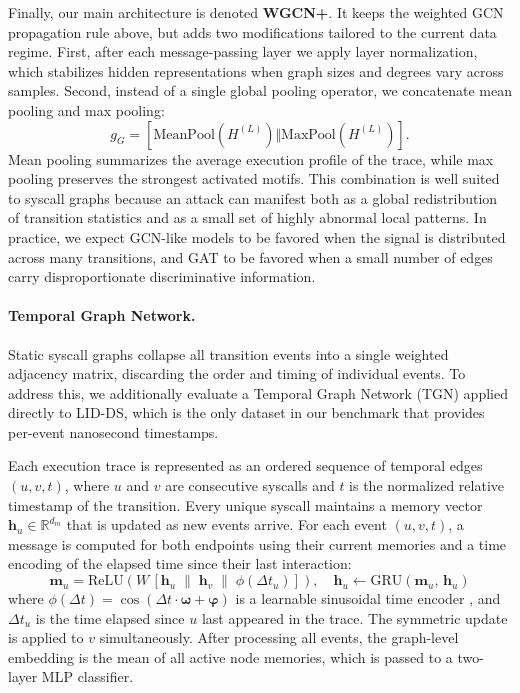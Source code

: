 \documentclass{article}
\begin{document}
Finally, our main architecture is denoted \textbf{WGCN+}. It keeps the weighted GCN propagation rule above, but adds two modifications tailored to the current data regime. First, after each message-passing layer we apply layer normalization, which stabilizes hidden representations when graph sizes and degrees vary across samples. Second, instead of a single global pooling operator, we concatenate mean pooling and max pooling:
\[
g_G = \left[\mathrm{MeanPool}\!\left(H^{(L)}\right) \Vert \mathrm{MaxPool}\!\left(H^{(L)}\right)\right].
\]
Mean pooling summarizes the average execution profile of the trace, while max pooling preserves the strongest activated motifs. This combination is well suited to syscall graphs because an attack can manifest both as a global redistribution of transition statistics and as a small set of highly abnormal local patterns. In practice, we expect GCN-like models to be favored when the signal is distributed across many transitions, and GAT to be favored when a small number of edges carry disproportionate discriminative information.

\paragraph{Temporal Graph Network.}
Static syscall graphs collapse all transition events into a single weighted adjacency matrix, discarding the order and timing of individual events. To address this, we additionally evaluate a Temporal Graph Network (TGN) \cite{tgn} applied directly to LID-DS, which is the only dataset in our benchmark that provides per-event nanosecond timestamps.

Each execution trace is represented as an ordered sequence of temporal edges $(u, v, t)$, where $u$ and $v$ are consecutive syscalls and $t$ is the normalized relative timestamp of the transition. Every unique syscall maintains a memory vector $\mathbf{h}_u \in \mathbb{R}^{d_m}$ that is updated as new events arrive. For each event $(u, v, t)$, a message is computed for both endpoints using their current memories and a time encoding of the elapsed time since their last interaction:
\[
    \mathbf{m}_u = \text{ReLU}\!\left(W\,[\mathbf{h}_u \;\|\; \mathbf{h}_v \;\|\; \phi(\Delta t_u)]\right), \quad
    \mathbf{h}_u \leftarrow \text{GRU}(\mathbf{m}_u,\, \mathbf{h}_u)
\]
where $\phi(\Delta t) = \cos(\Delta t \cdot \boldsymbol{\omega} + \boldsymbol{\varphi})$ is a learnable sinusoidal time encoder \cite{tgn}, and $\Delta t_u$ is the time elapsed since $u$ last appeared in the trace. The symmetric update is applied to $v$ simultaneously. After processing all events, the graph-level embedding is the mean of all active node memories, which is passed to a two-layer MLP classifier.
\end{document}

